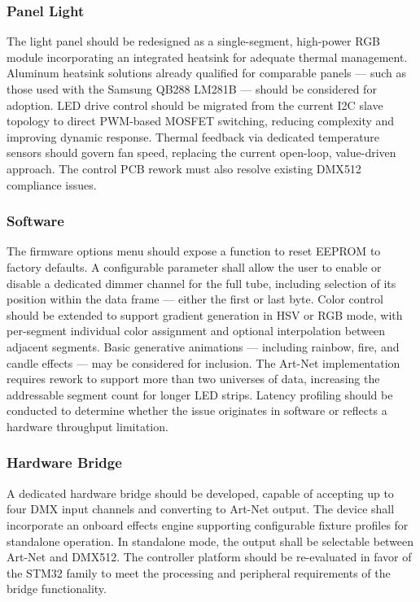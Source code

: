 \subsubsection{Panel Light}
The light panel should be redesigned as a single-segment, high-power \ac{RGB} module incorporating an integrated heatsink for adequate thermal management. Aluminum heatsink solutions already qualified for comparable panels — such as those used with the Samsung QB288 LM281B — should be considered for adoption. \ac{LED} drive control should be migrated from the current \ac{I2C} slave topology to direct \ac{PWM}-based MOSFET switching, reducing complexity and improving dynamic response. Thermal feedback via dedicated temperature sensors should govern fan speed, replacing the current open-loop, value-driven approach. The control \ac{PCB} rework must also resolve existing \ac{DMX}512 compliance issues.

\subsubsection{Software}
The firmware options menu should expose a function to reset \ac{EEPROM} to factory defaults. A configurable parameter shall allow the user to enable or disable a dedicated dimmer channel for the full tube, including selection of its position within the data frame — either the first or last byte. Color control should be extended to support gradient generation in \ac{HSV} or \ac{RGB} mode, with per-segment individual color assignment and optional interpolation between adjacent segments. Basic generative animations — including rainbow, fire, and candle effects — may be considered for inclusion. The Art-Net implementation requires rework to support more than two universes of data, increasing the addressable segment count for longer \ac{LED} strips. Latency profiling should be conducted to determine whether the issue originates in software or reflects a hardware throughput limitation.

\subsubsection{Hardware Bridge}
A dedicated hardware bridge should be developed, capable of accepting up to four \ac{DMX} input channels and converting to Art-Net output. The device shall incorporate an onboard effects engine supporting configurable fixture profiles for standalone operation. In standalone mode, the output shall be selectable between Art-Net and \ac{DMX}512. The controller platform should be re-evaluated in favor of the STM32 family to meet the processing and peripheral requirements of the bridge functionality.
